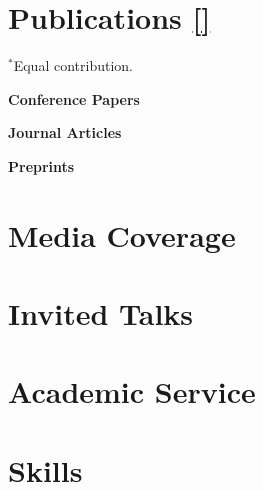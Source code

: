 \documentclass[11pt]{article}
\begin{document}
\section*{Publications \texorpdfstring{{\normalsize\href{https://scholar.google.com/citations?user=QG-BAGwAAAAJ&hl=en}{[\faGoogle]}}}{}}
\label{pubs}
{\small $^*$Equal contribution.}\par\vspace{0.3em}
\nocite{*}
{\noindent\textbf{Conference Papers}}\par\vspace{0.3em}
\begin{refcontext}[labelprefix=C]
\printbibliography[keyword=conf,heading=none,resetnumbers=true]
\end{refcontext}
\vspace{0.5em}
{\noindent\textbf{Journal Articles}}\par\vspace{0.3em}
\begin{refcontext}[labelprefix=J]
\printbibliography[keyword=journal,heading=none,resetnumbers=true]
\end{refcontext}
\vspace{0.5em}
{\noindent\textbf{Preprints}}\par\vspace{0.3em}
\begin{refcontext}[labelprefix=PP]
\printbibliography[keyword=preprint,heading=none,resetnumbers=true]
\end{refcontext}

\section*{Media Coverage}
\label{press}


\section*{Invited Talks}
\label{talks}


\section*{Academic Service}
\label{service}


\section*{Skills}
\label{skills}

\end{document}
